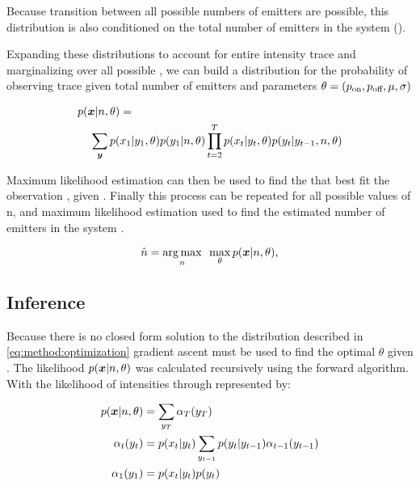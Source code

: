 Because transition between all possible numbers of emitters are possible, this distribution is also conditioned on the total number of emitters in the system (\n).

Expanding these distributions to account for entire intensity trace \trace and marginalizing over all possible \states, we can build a distribution for the probability of observing trace \trace given total number of emitters \n and parameters $\theta = (p_\text{on}, p_\text{off}, \mu, \sigma)$

\begin{align*}
  p(\bm{x}|n,\theta) &=\\
    \sum_{\bm{y}}
      p(&x_{1}|y_{1}, \theta)
      p(y_{1}|n, \theta)
      \prod_{t=2}^{T}
        p(x_{t}|y_{t}, \theta)
        p(y_{t}|y_{t-1},n, \theta)
  \label{eq:method:likelihood}
\end{align*}

Maximum likelihood estimation can then be used to find the \parameters that best fit the observation \trace, given \n. 
Finally this process can be repeated for all possible values of n, and maximum likelihood estimation used to find the estimated number of emitters in the system \estimatedn.

\begin{equation}
    \hat{n} =
    \mathop{\arg\max}_{n}\hspace{0.5em}
    \max_\theta
    p(\bm{x}|n,\theta)
  \text{,}
  \label{eq:method:optimization}
\end{equation}

\subsection{Inference}


Because there is no closed form solution to the distribution described in \eqref{eq:method:optimization} gradient ascent must be used to find the optimal $\theta$ given \n.
The likelihood $p(\bm{x} | n, \theta)$ was calculated recursively using the forward algorithm. 
With the likelihood of intensities  through  represented by:

\begin{align*}
  p(\bm{x}|n,\theta) &= \sum_{y_{T}} \alpha_T(y_{T})\\
  \alpha_{t}(y_{t}) &= p(x_{t}|y_{t}) \sum_{y_{t-1}} p(y_{t} | y_{t-1}) \alpha_{t-1}(y_{t-1})\\
  \alpha_{1}(y_{1}) &= p(x_{t}|y_{t}) p(y_{t})
\end{align*}

